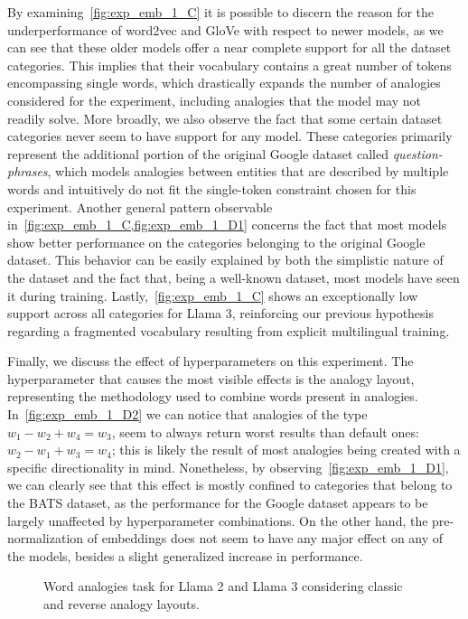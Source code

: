 By examining~\cref{fig:exp_emb_1_C} it is possible to discern the reason for the underperformance of word2vec and GloVe with respect to newer models, as we can see that these older models offer a near complete support for all the dataset categories.
This implies that their vocabulary contains a great number of tokens encompassing single words, which drastically expands the number of analogies considered for the experiment, including analogies that the model may not readily solve.
More broadly, we also observe the fact that some certain dataset categories never seem to have support for any model.
These categories primarily represent the additional portion of the original Google dataset called \emph{question-phrases}, which models analogies between entities that are described by multiple words and intuitively do not fit the single-token constraint chosen for this experiment.
Another general pattern observable in~\cref{fig:exp_emb_1_C,fig:exp_emb_1_D1} concerns the fact that most models show better performance on the categories belonging to the original Google dataset.
This behavior can be easily explained by both the simplistic nature of the dataset and the fact that, being a well-known dataset, most models have seen it during training.
Lastly,~\cref{fig:exp_emb_1_C} shows an exceptionally low support across all categories for Llama 3, reinforcing our previous hypothesis regarding a fragmented vocabulary resulting from explicit multilingual training.

Finally, we discuss the effect of hyperparameters on this experiment.
The hyperparameter that causes the most visible effects is the analogy layout, representing the methodology used to combine words present in analogies.
In~\cref{fig:exp_emb_1_D2} we can notice that analogies of the type $w_1 - w_2 + w_4 = w_3$, seem to always return worst results than default ones: $w_2 - w_1 + w_3 = w_4$; this is likely the result of most analogies being created with a specific directionality in mind.
Nonetheless, by observing~\cref{fig:exp_emb_1_D1}, we can clearly see that this effect is mostly confined to categories that belong to the BATS dataset, as the performance for the Google dataset appears to be largely unaffected by hyperparameter combinations.
On the other hand, the pre-normalization of embeddings does not seem to have any major effect on any of the models, besides a slight generalized increase in performance.

\begin{figure}[t!]
    \centering
    \quad
    \caption{Word analogies task for Llama 2 and Llama 3 considering classic and reverse analogy layouts.}
    \label{fig:exp_emb_1_D}
\end{figure}

